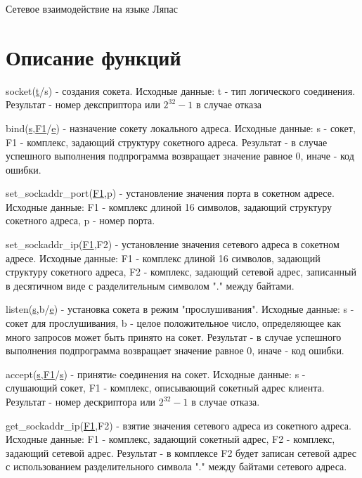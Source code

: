\documentclass[12t,english,russian]{article}
\begin{document}
\huge
\begin{center}
{Сетевое взаимодействие на языке Ляпас}
\end{center}
\Large
\tableofcontents
\newpage

\large
\section[Описание функций]{Описание функций}
\label{socket}
\hspace{\parindent}
socket(\hyperref[type]{t}/s) - создания сокета. Исходные данные: t - тип логического соединения. Результат - номер дексприптора или $2^{32}-1$ в случае отказа

\label{bind}
bind(\hyperref[socket]{s},\hyperref[sockaddr]{F1}/\hyperref[error]{e}) - назначение сокету локального адреса. Исходные данные: s - сокет, F1 - комплекс, задающий структуру сокетного адреса. Результат - в случае успешного выполнения подпрограмма возвращает значение равное 0, иначе - код ошибки.

\label{set_sockaddr_port}
set\_sockaddr\_port(\hyperref[sockaddr]{F1},p) - установление значения порта в сокетном адресе. Исходные данные: F1 - комплекс длиной 16 символов, задающий структуру сокетного адреса, p - номер порта.

\label{set_sockaddr_ip}
set\_sockaddr\_ip(\hyperref[sockaddr]{F1},F2) - установление значения сетевого адреса в сокетном адресе. Исходные данные: F1 - комплекс длиной 16 символов, задающий структуру сокетного адреса, F2 - комплекс, задающий сетевой адрес, записанный в десятичном виде с разделительным символом "." между байтами.

\label{listen}
listen(\hyperref[socket]{s},b/\hyperref[error]{e}) - установка сокета в режим "прослушивания". Исходные данные: s - сокет для прослушивания, b - целое положительное число, определяющее как много запросов может быть принято на сокет. Результат - в случае успешного выполнения подпрограмма возвращает значение равное 0, иначе - код ошибки.

\label{accept}
accept(\hyperref[socket]{s},\hyperref[sockaddr]{F1}/\hyperref[socket]{s}) - принятиe соединения на сокет. Исходные данные: s - слушающий сокет, F1 - комплекс, описывающий сокетный адрес клиента. Результат - номер дескриптора или $2^{32}-1$ в случае отказа.

get\_sockaddr\_ip(\hyperref[sockaddr]{F1},F2) - взятие значения сетевого адреса из сокетного адреса. Исходные данные: F1 - комплекс, задающий сокетный адрес, F2 - комплекс, задающий сетевой адрес. Результат - в комплексе F2 будет записан сетевой адрес с использованием разделительного символа "." между байтами сетевого адреса.
\end{document}
